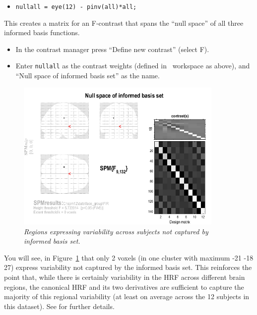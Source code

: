 \begin{itemize}
\item{\verb!nullall = eye(12) - pinv(all)*all;!}
\end{itemize}

This creates a matrix for an F-contrast that spans the ``null space'' of all three informed basis functions.
\begin{itemize}
\item In the contrast manager press ``Define new contrast'' (select F).
\item Enter \texttt{nullall} as the contrast weights (defined in \matlab\ workspace as above), and ``Null space of informed basis set'' as the name.
\end{itemize}

\begin{figure}
\begin{center}
\includegraphics[width=100mm]{faces_group/nullall}
\caption{\em Regions expressing variability across subjects not captured by informed basis set. \label{nullall}}
\end{center}
\end{figure}
You will see, in Figure~\ref{nullall} that only 2 voxels (in one cluster with maximum -21 -18 27) express variability not captured by the informed basis set. This reinforces the point that, while there is certainly variability in the HRF across different brain regions, the canonical HRF and its two derivatives are sufficient to capture the majority of this regional variability (at least on average across the 12 subjects in this dataset). See \cite{rnah_basis} for further details.
